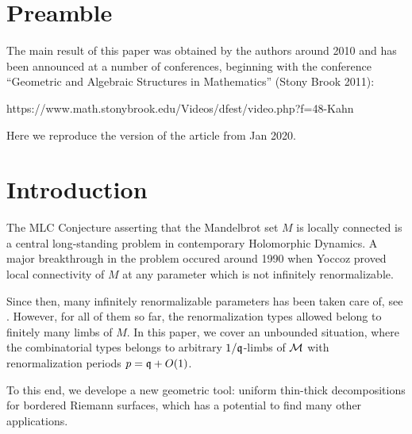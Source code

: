 
\section {Preamble}

The main result of this paper was obtained by the authors around 2010
and has been announced at a number of conferences,
beginning with the conference
``Geometric and Algebraic Structures in Mathematics''
(Stony Brook 2011):

\msk
https://www.math.stonybrook.edu/Videos/dfest/video.php?f=48-Kahn
\msk

Here we reproduce the version of the article from  Jan 2020.

\section{Introduction}

The MLC Conjecture asserting that the Mandelbrot set $M$  is locally connected is a
central long-standing problem in contemporary Holomorphic Dynamics.
A major breakthrough in the problem occured around 1990
when Yoccoz proved local connectivity of $M$ at any parameter which is not infinitely renormalizable.

Since then, many infinitely renormalizable parameters has been taken care of,
see \cite{puzzle,K,decorations,molecules}.
However, for all of them so far, the renormalization types allowed
belong to finitely many limbs of $M$. In this paper, we cover an unbounded situation,
where the combinatorial types belongs to arbitrary  $1/{\mathfrak{q}}$-limbs of ${\mathcal M}$
with renormalization periods $p= {\mathfrak{q}}+O(1)$.

To this end, we develope a new geometric tool:
uniform thin-thick decompositions for bordered Riemann surfaces,
which has a potential to  find many other applications.   